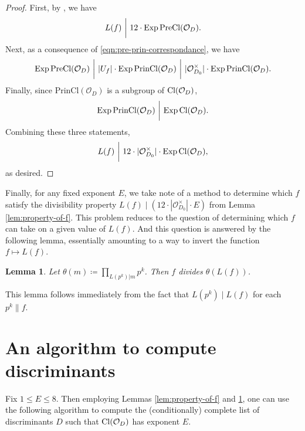 \documentclass[11pt,letterpaper,reqno]{amsart}
\newtheorem{lemma}[theorem]{Lemma}
\numberwithin{equation}{section}
\numberwithin{figure}{section}
\numberwithin{table}{section}
\newcommand{\Or}[1]{\mathcal{O}_{#1}}
\newcommand{\Cl}[1]{\textnormal{Cl}(\mathcal{O}_{#1})}
\newcommand{\PrinCl}[1]{\text{PrinCl}(\mathcal{O}_{#1})}
\newcommand{\PreCl}[1]{\text{PreCl}(\mathcal{O}_{#1})}
\newcommand{\Exp}{\textnormal{Exp}\,}
\begin{document}
\begin{proof}
    First, by \cite[Proposition 2.3]{FanPollack}, we have
    \[
        L(f) \ \bigg|\  12\cdot \Exp \PreCl{D}.
    \]
    Next, as a consequence of \eqref{eqn:pre-prin-correspondance}, we have
    \[
        \Exp\PreCl{D} \ \bigg|\  |U_f| \cdot \Exp\PrinCl{D} \ \bigg| \ |\Or{D_0}^\times| \cdot  \Exp\PrinCl{D}.
    \]
    Finally, since $\PrinCl{D}$ is a subgroup of $\Cl{D}$,
    \[
        \Exp\PrinCl{D} \ \bigg|\  \Exp\Cl{D}.
    \]
    Combining these three statements,
    \[
        L(f) \ \bigg|\  12\cdot |\Or{D_0}^\times| \cdot \Exp\Cl{D},
    \]
    as desired.
\end{proof}



Finally, for any fixed exponent $E$, we take note of a method to determine which $f$ satisfy the divisibility property $L(f) \mid  (12\cdot |\Or{D_0}^\times| \cdot E)$ from Lemma \ref{lem:property-of-f}. This problem reduces to the question of determining which $f$ can take on a given value of $L(f)$. And this question is answered by the following lemma, essentially amounting to a way to invert the function $f \mapsto L(f)$. 

\begin{lemma} \label{lem:f-divides-L(theta(f))}
    Let $\displaystyle
    \theta(m) \coloneq \prod_{L(p^k)| m} p^k$. Then
    $f$ divides $\theta(L(f))$.
\end{lemma}
This lemma follows immediately from the fact that $L(p^k) \mid  L(f)$ for each $p^k \parallel f$. 






\section{An algorithm to compute discriminants} \label{sec:algorithm-to-compute-discriminants}

Fix $1 \le E \le 8$. Then employing Lemmas \ref{lem:property-of-f} and \ref{lem:f-divides-L(theta(f))}, one can use the following algorithm to compute the (conditionally) complete list of discriminants $D$ such that $\Cl{D}$ has exponent $E$.
\end{document}
